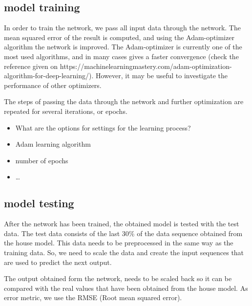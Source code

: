 \subsection{model training}
In order to train the network, we pass all input data through the network. The mean squared error of the result is computed, and using the Adam-optimizer algorithm the network is improved. The Adam-optimizer is currently one of the most used algorithms, and in many cases gives a faster convergence (check the reference given on https://machinelearningmastery.com/adam-optimization-algorithm-for-deep-learning/). However, it may be useful to investigate the performance of other optimizers.
 
The steps of passing the data through the network and further optimization are repeated for several iterations, or epochs.
 

\begin{itemize}
\item What are the options for settings for the learning process?
\item Adam learning algorithm
\item number of epochs
\item \ldots
\end{itemize}



\subsection{model testing}
After the network has been trained, the obtained model is tested with the test data. The test data consists of the last 30\% of the data sequence obtained from the house model. This data needs to be preprocessed in the same way as the training data. So, we need to scale the data and create the input sequences that are used to predict the next output. 

The output obtained form the network, needs to be scaled back so it can be compared with the real values that have been obtained from the house model. As error metric, we use the RMSE (Root mean squared error). 

